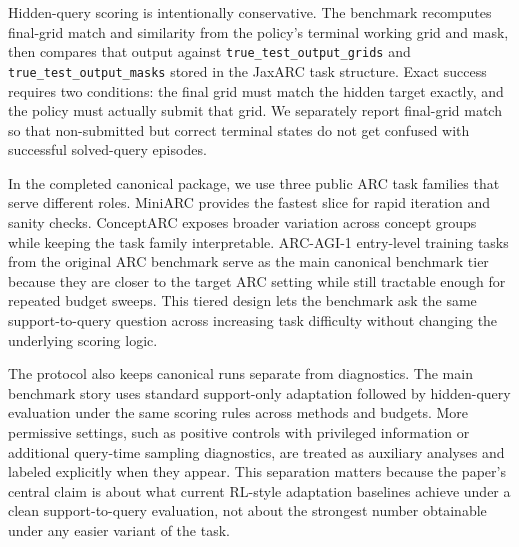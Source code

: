 Hidden-query scoring is intentionally conservative. The benchmark recomputes final-grid match and similarity from the policy's terminal working grid and mask, then compares that output against \texttt{true\_test\_output\_grids} and \texttt{true\_test\_output\_masks} stored in the JaxARC task structure. Exact success requires two conditions: the final grid must match the hidden target exactly, and the policy must actually submit that grid. We separately report final-grid match so that non-submitted but correct terminal states do not get confused with successful solved-query episodes.

In the completed canonical package, we use three public ARC task families that serve different roles. MiniARC \citep{kimPlaygroundsAbstractionReasoning2022} provides the fastest slice for rapid iteration and sanity checks. ConceptARC \citep{moskvichevConceptARCBenchmarkEvaluating2023} exposes broader variation across concept groups while keeping the task family interpretable. ARC-AGI-1 entry-level training tasks from the original ARC benchmark \citep{cholletMeasureIntelligence2019} serve as the main canonical benchmark tier because they are closer to the target ARC setting while still tractable enough for repeated budget sweeps. This tiered design lets the benchmark ask the same support-to-query question across increasing task difficulty without changing the underlying scoring logic.

The protocol also keeps canonical runs separate from diagnostics. The main benchmark story uses standard support-only adaptation followed by hidden-query evaluation under the same scoring rules across methods and budgets. More permissive settings, such as positive controls with privileged information or additional query-time sampling diagnostics, are treated as auxiliary analyses and labeled explicitly when they appear. This separation matters because the paper's central claim is about what current RL-style adaptation baselines achieve under a clean support-to-query evaluation, not about the strongest number obtainable under any easier variant of the task.
